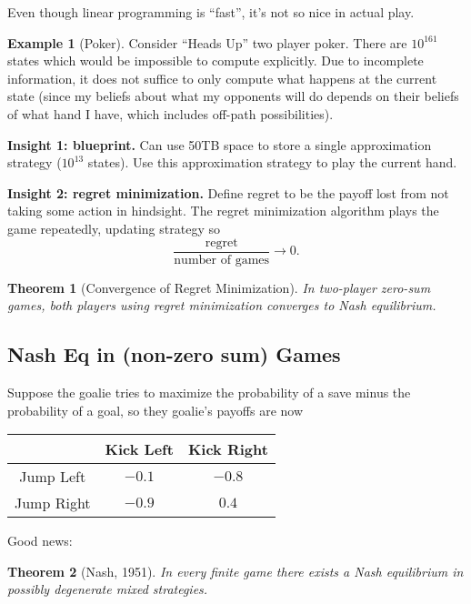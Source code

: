 \documentclass[dvipsnames]{article}
\newtheorem{theorem}{Theorem}[section]
\theoremstyle{definition}
\newtheorem{example}[definition]{Example}
\theoremstyle{remark}
\begin{document}
Even though linear programming is ``fast'', it's not so nice in actual play.

\begin{example}[Poker]
	Consider ``Heads Up'' two player poker. There are $10^161$ states which would be impossible to compute explicitly. Due to incomplete information, it does not suffice to only compute what happens at the current state (since my beliefs about what my opponents will do depends on their beliefs of what hand I have, which includes off-path possibilities).
	
	\textbf{Insight 1: blueprint.} Can use 50TB space to store a single approximation strategy ($10^13$ states). Use this approximation strategy to play the current hand.
	
	\textbf{Insight 2: regret minimization.} Define regret to be the payoff lost from not taking some action in hindsight. The regret minimization algorithm plays the game repeatedly, updating strategy so 
	$$\frac{\text{regret}}{\text{number of games}} \to 0.$$
\end{example}

\begin{theorem}[Convergence of Regret Minimization]
	In two-player zero-sum games, both players using regret minimization converges to Nash equilibrium. 
\end{theorem}

\subsection{Nash Eq in (non-zero sum) Games}

Suppose the goalie tries to maximize the probability of a save minus the probability of a goal, so they goalie's payoffs are now
\begin{table}[h]\centering
	\begin{tabular}{c|c|c|}
		& Kick Left & Kick Right \\ \hline
		Jump Left & $-0.1$ & $-0.8$  \\ \hline
		Jump Right & $-0.9$ & $0.4$ \\ \hline
	\end{tabular}
\end{table}

Good news:

\begin{theorem}[Nash, 1951]
	In every finite game there exists a Nash equilibrium in possibly degenerate mixed strategies.
\end{theorem}
\end{document}

